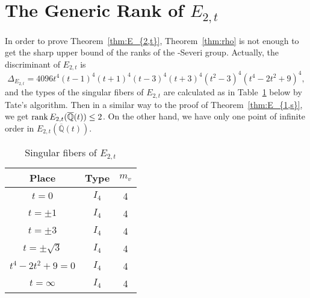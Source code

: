 \documentclass[main]{subfiles}
\begin{document}
\section{The Generic Rank of \texorpdfstring{$E_{2,t}$}{E2,t}}

In order to prove Theorem~\ref{thm:E_{2,t}}, Theorem~\ref{thm:rho} is not enough to get the sharp upper bound of the ranks of the \Neron-Severi group.
Actually, the discriminant of $E_{2,t}$ is 
\begin{equation*}
    \Delta_{E_{2,t}} = 4096t^{4}(t - 1)^{4}(t + 1)^{4}(t - 3)^{4}(t + 3)^{4}(t^{2} - 3)^{4}(t^{4} - 2t^{2} + 9)^{4},
\end{equation*}
and the types of the singular fibers of $E_{2,t}$ are calculated as in Table~\ref{tab:E_{2,t}} below by Tate's algorithm.
Then in a similar way to the proof of Theorem~\ref{thm:E_{1,s}}, we get $\operatorname{rank} E_{2,t}(\overline{\mathbb{Q}}(t)) \leq 2$.
On the other hand, we have only one point of infinite order in $E_{2,t}(\overline{\mathbb{Q}}(t))$.
\begin{table}[ht]
    \centering
    \caption{Singular fibers of $E_{2,t}$}
    \begin{tabular}{|c|c|c|}
        \hline
        Place            & Type  & $m_v$ \\
        \hline
        $t=0$            & $I_4$ & 4     \\
        $t=\pm 1$        & $I_4$ & 4     \\
        $t=\pm 3$        & $I_4$ & 4     \\
        $t=\pm \sqrt{3}$ & $I_4$ & 4     \\
        $t^4-2t^2+9=0$   & $I_4$ & 4     \\
        $t=\infty$       & $I_4$ & 4     \\
        \hline
    \end{tabular}
    \label{tab:E_{2,t}}
\end{table}

\end{document}
